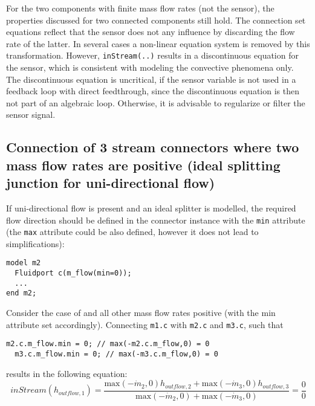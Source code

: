For the two components with finite mass flow rates (not the sensor), the
properties discussed for two connected components still hold. The
connection set equations reflect that the sensor does not any influence
by discarding the flow rate of the latter. In several cases a non-linear
equation system is removed by this transformation. However, \lstinline!inStream(..)!
results in a discontinuous equation for the sensor, which is consistent
with modeling the convective phenomena only. The discontinuous equation
is uncritical, if the sensor variable is not used in a feedback loop
with direct feedthrough, since the discontinuous equation is then not
part of an algebraic loop. Otherwise, it is advisable to regularize or
filter the sensor signal.

\subsection{Connection of 3 stream connectors where two mass flow rates are positive (ideal splitting junction for uni-directional flow)}

If uni-directional flow is present and an ideal splitter is modelled,
the required flow direction should be defined in the connector instance
with the \lstinline!min! attribute (the \lstinline!max! attribute could be also defined,
however it does not lead to simplifications):
\begin{lstlisting}[language=modelica]
model m2
  Fluidport c(m_flow(min=0));
  ...
end m2;
\end{lstlisting}

Consider the case of and all other mass flow rates positive (with the
min attribute set accordingly). Connecting \lstinline!m1.c! with \lstinline!m2.c! and \lstinline!m3.c!, such
that

\begin{lstlisting}[language=modelica]
  m2.c.m_flow.min = 0; // max(-m2.c.m_flow,0) = 0
  m3.c.m_flow.min = 0; // max(-m3.c.m_flow,0) = 0
\end{lstlisting}
results in the following equation:
\begin{equation*}
inStream(h_{outflow,1})=\frac{\text{max}(-\dot{m}_2,0)h_{outflow,2}+\text{max}(-\dot{m}_3,0)h_{outflow,3}}{\text{max}(-\dot{m}_2,0)+\text{max}(-\dot{m}_3,0)}=\frac{0}{0}
\end{equation*}


